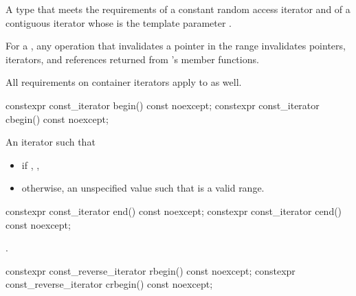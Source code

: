 \begin{itemdescr}
\pnum
A type that meets the requirements
of a constant random access iterator and
of a contiguous iterator
whose  is the template parameter .

\pnum
For a , any operation that invalidates a pointer in the range  invalidates pointers, iterators, and references returned from 's member functions.

\pnum
All requirements on container iterators apply to  as well.
\end{itemdescr}

%
%
\begin{itemdecl}
constexpr const_iterator begin() const noexcept;
constexpr const_iterator cbegin() const noexcept;
\end{itemdecl}

\begin{itemdescr}
\pnum
\returns
An iterator such that
\begin{itemize}
\item if , ,
\item otherwise, an unspecified value such that  is a valid range.
\end{itemize}
\end{itemdescr}

%
%
\begin{itemdecl}
constexpr const_iterator end() const noexcept;
constexpr const_iterator cend() const noexcept;
\end{itemdecl}

\begin{itemdescr}
\pnum
\returns
{}.
\end{itemdescr}

%
%
\begin{itemdecl}
constexpr const_reverse_iterator rbegin() const noexcept;
constexpr const_reverse_iterator crbegin() const noexcept;
\end{itemdecl}

